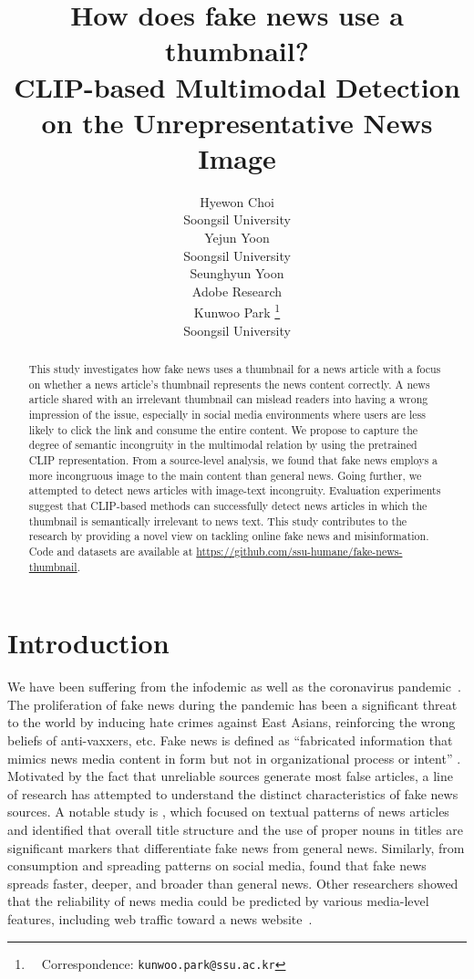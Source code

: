 \documentclass[11pt]{article}
\title{How does fake news use a thumbnail? \\CLIP-based Multimodal Detection on the Unrepresentative News Image}
\author{Hyewon Choi\\
 Soongsil University\\\And
 Yejun Yoon\\
 Soongsil University\\\And
 Seunghyun Yoon\\
 Adobe Research\\\And
 Kunwoo Park \thanks{~~Correspondence: \texttt{kunwoo.park@ssu.ac.kr}}\\
 Soongsil University\\
 }
\begin{document}
\maketitle
\begin{abstract}
This study investigates how fake news uses a thumbnail for a news article with a focus on whether a news article’s thumbnail represents the news content correctly. A news article shared with an irrelevant thumbnail can mislead readers into having a wrong impression of the issue, especially in social media environments where users are less likely to click the link and consume the entire content. We propose to capture the degree of semantic incongruity in the multimodal relation by using the pretrained CLIP representation. From a source-level analysis, we found that fake news employs a more incongruous image to the main content than general news. Going further, we attempted to detect news articles with image-text incongruity. Evaluation experiments suggest that CLIP-based methods can successfully detect news articles in which the thumbnail is semantically irrelevant to news text. This study contributes to the research by providing a novel view on tackling online fake news and misinformation. Code and datasets are available at \url{https://github.com/ssu-humane/fake-news-thumbnail}.
\end{abstract}

\section{Introduction}

We have been suffering from the infodemic as well as the coronavirus pandemic~\cite{zarocostas2020fight}. The proliferation of fake news during the pandemic has been a significant threat to the world by inducing hate crimes against East Asians, reinforcing the wrong beliefs of anti-vaxxers, etc. Fake news is defined as ``fabricated information that mimics news media content in form but not in organizational process or intent'' \cite{doi:10.1126/science.aao2998}. Motivated by the fact that unreliable sources generate most false articles, a line of research has attempted to understand the distinct characteristics of fake news sources. A notable study is \citet{horne2017just}, which focused on textual patterns of news articles and identified that overall title structure and the use of proper nouns in titles are significant markers that differentiate fake news from general news. Similarly, from consumption and spreading patterns on social media, \citet{vosoughi2018spread} found that fake news spreads faster, deeper, and broader than general news. Other researchers showed that the reliability of news media could be predicted by various media-level features, including web traffic toward a news website~\cite{baly-etal-2018-predicting}.
\end{document}
